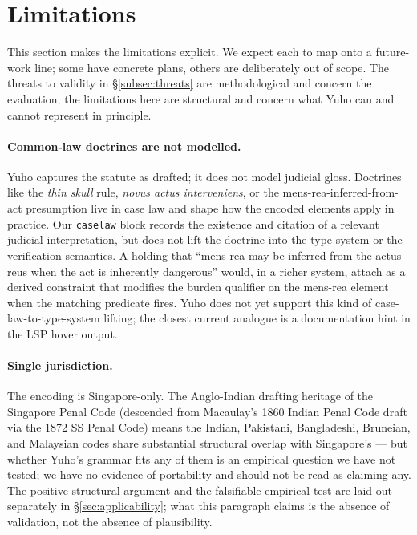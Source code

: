 \section{Limitations}
\label{sec:limitations}

This section makes the limitations explicit. We expect each to map onto
a future-work line; some have concrete plans, others are deliberately
out of scope. The threats to validity in \S\ref{subsec:threats} are
methodological and concern the evaluation; the limitations here are
structural and concern what Yuho can and cannot represent in principle.

\paragraph{Common-law doctrines are not modelled.} Yuho captures the
statute as drafted; it does not model judicial gloss. Doctrines like
the \emph{thin skull} rule, \emph{novus actus interveniens}, or the
mens-rea-inferred-from-act presumption live in case law and shape
how the encoded elements apply in practice. Our \texttt{caselaw}
block records the existence and citation of a relevant judicial
interpretation, but does not lift the doctrine into the type system
or the verification semantics. A holding that ``mens rea may be
inferred from the actus reus when the act is inherently dangerous''
would, in a richer system, attach as a derived constraint that
modifies the burden qualifier on the mens-rea element when the
matching predicate fires. Yuho does not yet support this kind of
case-law-to-type-system lifting; the closest current analogue is a
documentation hint in the LSP hover output.

\paragraph{Single jurisdiction.} The encoding is Singapore-only. The
Anglo-Indian drafting heritage of the Singapore Penal Code (descended
from Macaulay's 1860 Indian Penal Code draft via the 1872 SS Penal
Code) means the Indian, Pakistani, Bangladeshi, Bruneian, and
Malaysian codes share substantial structural overlap with Singapore's
--- but whether Yuho's grammar fits any of them is an empirical
question we have not tested; we have no evidence of portability and
should not be read as claiming any. The positive structural argument
and the falsifiable empirical test are laid out separately in
\S\ref{sec:applicability}; what this paragraph claims is the absence
of validation, not the absence of plausibility.

